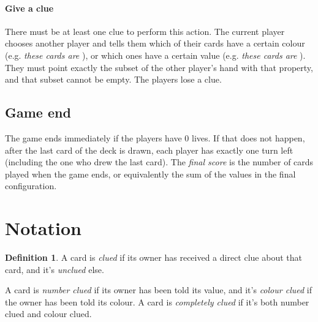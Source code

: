 \documentclass[a4paper]{article}
\theoremstyle{plain}
\theoremstyle{definition}
\newtheorem{definition}[theorem]{Definition}
\newtheorem{note}[theorem]{Note}
\begin{document}
\paragraph{Give a clue} There must be at least one clue to perform this action. The current player chooses another player and tells them which of their cards have a certain colour (e.g. \emph{these cards are }), or which ones have a certain value (e.g. \emph{these cards are }). They must point exactly the subset of the other player's hand with that property, and that subset cannot be empty. The players lose a clue.

\subsection{Game end}

The game ends immediately if the players have 0 lives. If that does not happen, after the last card of the deck is drawn, each player has exactly one turn left (including the one who drew the last card). The \emph{final score} is the number of cards played when the game ends, or equivalently the sum of the values in the final configuration.

%

\section{Notation}

\begin{definition}
	A card is \emph{clued} if its owner has received a direct clue about that card, and it's \emph{unclued} else.
	
	A card is \emph{number clued} if its owner has been told its value, and it's \emph{colour clued} if the owner has been told its colour. A card is \emph{completely clued} if it's both number clued and colour clued.
\end{definition}
\end{document}
